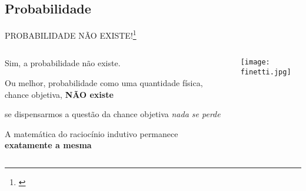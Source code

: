 

\subsection{Probabilidade}
\begin{frame}{PROBABILIDADE NÃO EXISTE!\footnote{\textcite{definettiTheoryProbability1974}}}
	\begin{columns}
		\begin{column}{0.8\textwidth}
			\begin{vfilleditems}
				\item Sim, a probabilidade não existe.
				\item Ou melhor, probabilidade como uma quantidade física,
				chance objetiva, \textbf{NÃO existe}
				\item se dispensarmos a questão da chance objetiva \textit{nada se perde}
				\item A matemática do raciocínio indutivo permanece
				\textbf{exatamente a mesma}
			\end{vfilleditems}
		\end{column}
		\begin{column}{0.2\textwidth}
			\centering
			\texttt{[image: finetti.jpg]}
		\end{column}
	\end{columns}
\end{frame}


